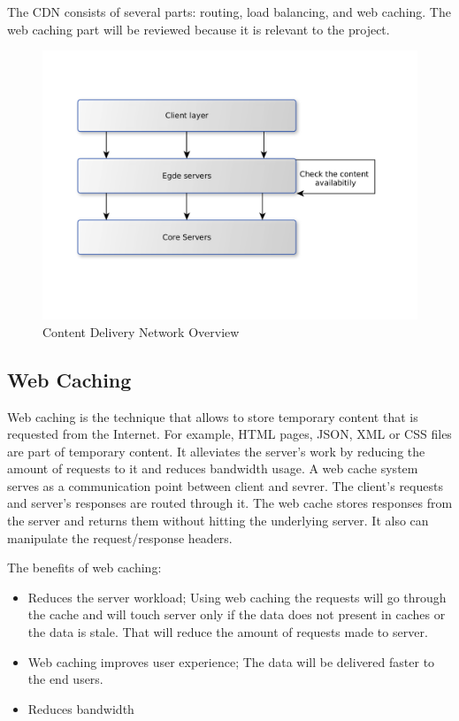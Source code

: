 The CDN consists of several parts: routing, load balancing, and web caching\cite{CDNOverview}. The web caching part will be reviewed because it is relevant to the project.

\begin{figure}[h]
    \centering
    \includegraphics[width=\textwidth]{images/cdn_arch.png}
    \caption{Content Delivery Network Overview}
    \label{fig:cdn_overview}
\end{figure}

\subsection{Web Caching}

Web caching is the technique that allows to store temporary content that is requested from the Internet. For example, HTML pages, JSON, XML or CSS files are part of temporary content. It alleviates the server's work by reducing the amount of requests to it and reduces bandwidth usage\cite{WebCachingInterior}. A web cache system serves as a communication point between client and sevrer. The client's requests and server's responses are routed through it. The web cache stores responses from the server and returns them without hitting the underlying server. It also can manipulate the request/response headers.

The benefits of web caching:

\begin{itemize}
    \item Reduces the server workload; Using web caching the requests will go through the cache and will touch server only if the data does not present in caches or the data is stale. That will reduce the amount of requests made to server.
    \item Web caching improves user experience; The data will be delivered faster to the end users.
    \item Reduces bandwidth
\end{itemize}

